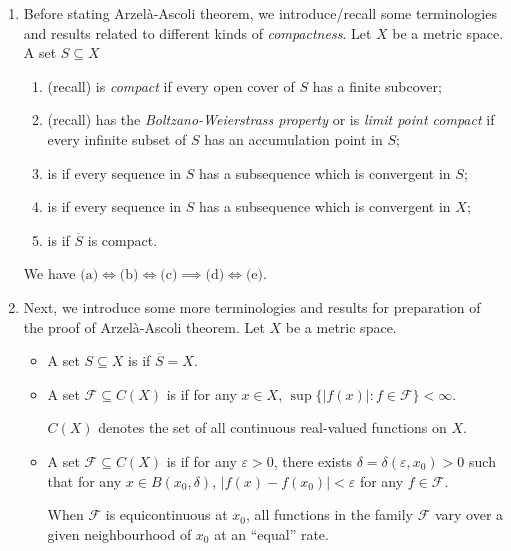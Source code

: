 \begin{enumerate}
\item Before stating Arzel\`a-Ascoli theorem, we introduce/recall some
terminologies and results related to different kinds of \emph{compactness}. Let
\(X\) be a metric space. A set \(S\subseteq X\)
\begin{enumerate}
\item (recall) is \emph{compact} if every open cover of \(S\) has a finite subcover;
\item (recall) has the \emph{Boltzano-Weierstrass property} or is \emph{limit
point compact} if every infinite subset of \(S\) has an accumulation point in \(S\);
\item is  if every sequence in \(S\) has a subsequence
which is convergent in \(S\);
\item is  if every sequence in \(S\) has a
subsequence which is convergent in \(X\);
\item is  if \(\overline{S}\) is compact.
\end{enumerate}
\begin{theorem}
\label{thm:diff-cpt-relate}
We have \(\text{(a)}\iff\text{(b)}\iff\text{(c)}\implies
\text{(d)}\iff\text{(e)}\).
\end{theorem}
\item Next, we introduce some more terminologies and results for preparation of
the proof of Arzel\`a-Ascoli theorem. Let \(X\) be a metric space.
\begin{itemize}
\item A set \(S\subseteq X\) is  if \(\overline{S}=X\).
\item A set \(\mathcal{F}\subseteq C(X)\) is  if for any \(x\in
X\), \(\sup\{|f(x)|:f\in \mathcal{F}\}<\infty\). \begin{note}
\(C(X)\) denotes the set of all continuous real-valued functions on \(X\).
\end{note}
\item A set \(\mathcal{F}\subseteq C(X)\) is  if for any \(\varepsilon>0\), there exists
\(\delta=\delta(\varepsilon,x_0)>0\) such that for any \(x\in B(x_0,\delta)\),
\(|f(x)-f(x_0)|<\varepsilon\) for any \(f\in \mathcal{F}\).
\begin{intuition}
When \(\mathcal{F}\) is equicontinuous at \(x_0\), all functions in the family
\(\mathcal{F}\) vary over a given neighbourhood of \(x_0\) at an ``equal''
rate.
\end{intuition}


\end{itemize}
\end{enumerate}

